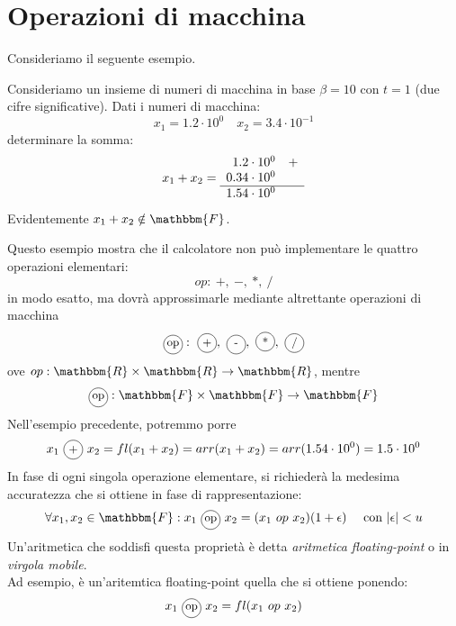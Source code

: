 \documentclass[12pt]{report}
\newcommand{\circled}[1]{%
	\begin{tikzpicture}[baseline=(char.base)]
		\node[shape=circle, draw, inner sep=1.2pt, minimum size=1.5em] (char) {\small #1};
	\end{tikzpicture}%
}
\begin{document}
\section{Operazioni di macchina}
Consideriamo il seguente esempio.
\begin{example}{}{}
	Consideriamo un insieme di numeri di macchina in base $\beta = 10$ con $t = 1$ (due cifre significative). Dati i numeri di macchina:
	\[
	x_1 = 1.2 \cdot 10^0 \quad x_2 = 3.4 \cdot 10^{-1}
	\]
	determinare la somma:
	\[
	x_1 + x_2 =
	\begin{array}{r@{\quad}l}
		1.2 \cdot 10^0 & + \\
		0.34 \cdot 10^0 &  \\
		\hline
		1.54 \cdot 10^0 &
	\end{array}
	\]
	Evidentemente $x_1 + x_2 \notin \mathbbm{F}$.
\end{example}
Questo esempio mostra che il calcolatore non può implementare le quattro operazioni elementari:
\[
op:\ +,\ -,\ *,\ /
\]
in modo esatto, ma dovrà approssimarle mediante altrettante operazioni di macchina
\[
\circled{op}:\ \circled{+},\ \circled{-},\ \circled{*},\ \circled{/}
\]
ove $op: \mathbbm{R} \times \mathbbm{R} \to \mathbbm{R}$, mentre \[
\circled{op}: \mathbbm{F} \times \mathbbm{F} \to \mathbbm{F}
\]
Nell'esempio precedente, potremmo porre
\[
x_1\ \circled{+}\ x_2 = fl(x_1 + x_2) = arr(x_1 + x_2) = arr(1.54 \cdot 10^0) = 1.5 \cdot 10^0
\]
In fase di ogni singola operazione elementare, si richiederà la medesima accuratezza che si ottiene in fase di rappresentazione:
\[
\forall x_1, x_2 \in \mathbbm{F}: x_1\ \circled{op}\ x_2 = (x_1\ op\ x_2)(1 + \epsilon) \quad \text{ con }|\epsilon| < u
\]
Un'aritmetica che soddisfi questa proprietà è detta \textit{aritmetica floating-point} o in \textit{virgola mobile}. \\
Ad esempio, è un'aritemtica floating-point quella che si ottiene ponendo:
\[
x_1\ \circled{op}\ x_2 = fl(x_1\ op\ x_2)
\]
\end{document}
